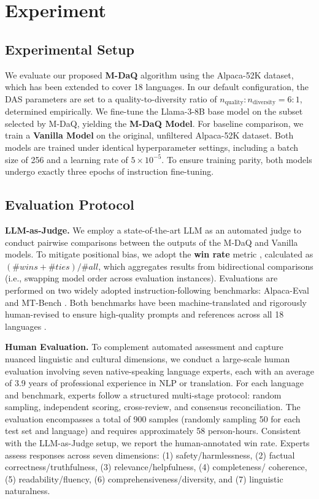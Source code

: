 \documentclass[sigconf]{acmart}
\begin{document}
\section{Experiment}
\label{sec:experiment}

\subsection{Experimental Setup}

We evaluate our proposed \textbf{M-DaQ} algorithm using the Alpaca-52K dataset, which has been extended to cover 18 languages. In our default configuration, the DAS parameters are set to a quality-to-diversity ratio of $n_{\text{quality}} : n_{\text{diversity}} = 6:1$, determined empirically. We fine-tune the Llama-3-8B base model on the subset selected by M-DaQ, yielding the \textbf{M-DaQ Model}. For baseline comparison, we train a \textbf{Vanilla Model} on the original, unfiltered Alpaca-52K dataset. Both models are trained under identical hyperparameter settings, including a batch size of 256 and a learning rate of $5 \times 10^{-5}$. To ensure training parity, both models undergo exactly three epochs of instruction fine-tuning.

\subsection{Evaluation Protocol}

\textbf{LLM-as-Judge.} We employ a state-of-the-art LLM as an automated judge to conduct pairwise comparisons between the outputs of the M-DaQ and Vanilla models. To mitigate positional bias, we adopt the \textbf{win rate} metric \cite{mt_bench}, calculated as $(\#wins+\#ties)/\#all$, which aggregates results from bidirectional comparisons (i.e., swapping model order across evaluation instances). Evaluations are performed on two widely adopted instruction-following benchmarks: Alpaca-Eval \cite{alpaca_eval} and MT-Bench \cite{mt_bench}. Both benchmarks have been machine-translated and rigorously human-revised to ensure high-quality prompts and references across all 18 languages \cite{midb}.

\textbf{Human Evaluation.} To complement automated assessment and capture nuanced linguistic and cultural dimensions, we conduct a large-scale human evaluation involving seven native-speaking language experts, each with an average of 3.9 years of professional experience in NLP or translation. For each language and benchmark, experts follow a structured multi-stage protocol: random sampling, independent scoring, cross-review, and consensus reconciliation. The evaluation encompasses a total of 900 samples (randomly sampling 50 for each test set and language) and requires approximately 58 person-hours. Consistent with the LLM-as-Judge setup, we report the human-annotated win rate. Experts assess responses across seven dimensions: (1) safety/harmlessness, (2) factual correctness/truthfulness, (3) relevance/helpfulness, (4) completeness/ coherence, (5) readability/fluency, (6) comprehensiveness/diversity, and (7) linguistic naturalness.
\end{document}
